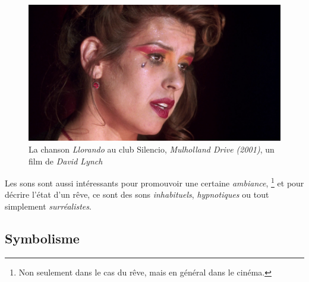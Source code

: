\documentclass[../main.tex]{subfile}
\begin{document}
\begin{figure}
    \centering
    \includegraphics[width=\linewidth]{images/silencio}
    \caption{La chanson \emph{Llorando} au club Silencio, \textit{Mulholland
             Drive (2001)}, un film de \textit{David Lynch}}
    \label{fig:images_silencio}
\end{figure}

Les sons sont aussi intéressants pour promouvoir une certaine \emph{ambiance},
\footnote{Non seulement dans le cas du rêve, mais en général dans le cinéma.} et
pour décrire l'état d'un rêve, ce sont des sons \emph{inhabituels},
\emph{hypnotiques} ou tout simplement \emph{surréalistes}.

\subsection{Symbolisme}
\end{document}
